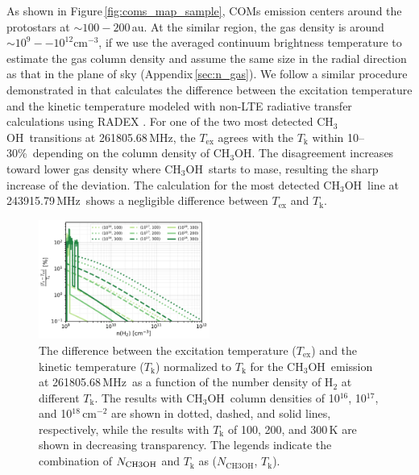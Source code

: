 \documentclass[twocolumn]{aastex62}
\newcommand{\mhz}{\mbox{\,MHz}}
\newcommand{\cc}{\mbox{cm$^{-3}$}}
\newcommand{\methanol}{\mbox{CH$_{3}$OH}}
\begin{document}
As shown in Figure\,\ref{fig:coms_map_sample}, COMs emission centers around the protostars at $\sim 100-200$\,au.  At the similar region, the gas density is around $\sim 10^{9}--10^{12}$\cc, if we use the averaged continuum brightness temperature to estimate the gas column density and assume the same size in the radial direction as that in the plane of sky (Appendix\,\ref{sec:n_gas}).  We follow a similar procedure demonstrated in \citet{2016AA...595A.117J} that calculates the difference between the excitation temperature and the kinetic temperature modeled with non-LTE radiative transfer calculations using RADEX \citep{2007AA...468..627V}.  For one of the two most detected \methanol\ transitions at 261805.68\mhz, the $T_\text{ex}$ agrees with the $T_\text{k}$ within 10--30\%\ depending on the column density of \methanol.  The disagreement increases toward lower gas density where \methanol\ starts to mase, resulting the sharp increase of the deviation.  The calculation for the most detected \methanol\ line at 243915.79\mhz\ shows a negligible difference between $T_\text{ex}$ and $T_\text{k}$.

\begin{figure}[htbp!]
  \centering
  \includegraphics[width=0.5\textwidth]{methanol_radex_highres.pdf}
  \caption{The difference between the excitation temperature ($T_\text{ex}$) and the kinetic temperature ($T_\text{k}$) normalized to $T_\text{k}$ for the \methanol\ emission at 261805.68\mhz\ as a function of the number density of H$_2$ at different $T_\text{k}$.  The results with \methanol\ column densities of 10$^{16}$, 10$^{17}$, and 10$^{18}$\,cm$^{-2}$ are shown in dotted, dashed, and solid lines, respectively, while the results with $T_\text{k}$ of 100, 200, and 300\,K are shown in decreasing transparency.  The legends indicate the combination of $N_{\rm CH3OH}$ and $T_\text{k}$ as ($N_\text{CH3OH}$, $T_\text{k}$).}
  \label{fig:radex}
\end{figure}
\end{document}
